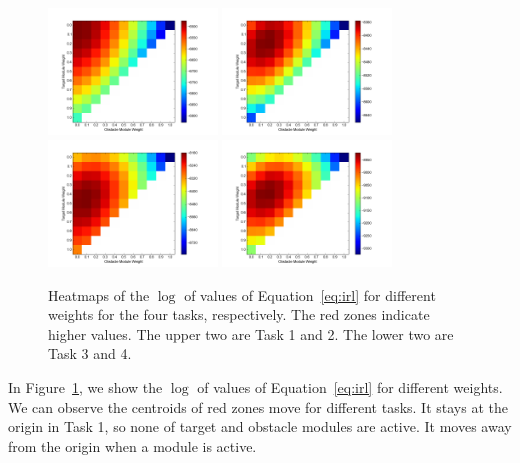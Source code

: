 \documentclass[11pt]{article} %
\begin{document}
\begin{figure}[h!]
\centering
\includegraphics[width=0.4\textwidth]{objValuesTask1.png}
\includegraphics[width=0.4\textwidth]{objValuesTask2.png}
\includegraphics[width=0.4\textwidth]{objValuesTask3.png}
\includegraphics[width=0.4\textwidth]{objValuesTask4.png}
\caption{Heatmaps of the $\log$ of values of Equation~\ref{eq:irl} for different
weights for the four tasks, respectively. The red zones indicate higher values.
The upper two are Task 1 and 2. The lower two are Task 3 and 4.
}
\label{fig:heatmap}
\end{figure}

In Figure~\ref{fig:heatmap}, we show the $\log$ of values of Equation~\ref{eq:irl} for
different weights. We can observe the centroids of red zones move for different
tasks. It stays at the origin in Task 1, so none of target and obstacle modules
are active. It moves away from the origin when a module is active.
\end{document}
